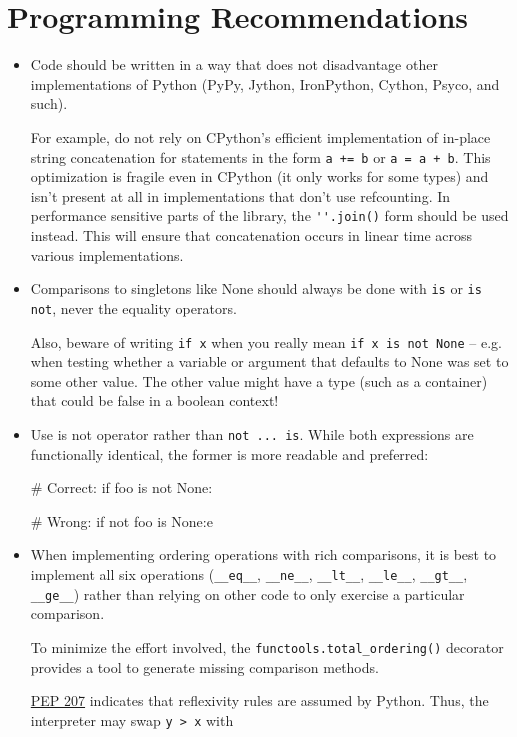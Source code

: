 \documentclass[a4paper,11pt]{article}
\begin{document}
\section{Programming Recommendations}
\begin{itemize}
\item Code should be written in a way that does not disadvantage other 
implementations of Python (PyPy, Jython, IronPython, Cython, Psyco, and such).
\par
For example, do not rely on CPython’s efficient implementation of in-place 
string concatenation for statements in the form \verb"a += b" or \verb"a = a + b".
This optimization is fragile even in CPython (it only works for some 
types) and isn’t present at all in implementations that don’t use 
refcounting. In performance sensitive parts of the library, the 
\verb!''.join()! form should be used instead. This will ensure that
concatenation occurs in linear time across various implementations.
\item Comparisons to singletons like None should always be done with 
\verb"is" or \verb"is not", never the equality operators.
\par
Also, beware of writing \verb"if x" when you really mean 
\verb"if x is not None" – e.g. when testing whether a variable or argument 
that defaults to None was set to some other value. The other value might have 
a type (such as a container) that could be false in a boolean context!
\item Use is not operator rather than \verb"not ... is". While both 
expressions are functionally identical, the former is more readable and 
preferred:
\begin{python}
# Correct:
if foo is not None:
\end{python}
\begin{python}
# Wrong:
if not foo is None:e
\end{python}
\item When implementing ordering operations with rich comparisons, it is best 
to implement all six operations (\verb"__eq__", \verb"__ne__", \verb"__lt__", 
\verb"__le__", \verb"__gt__", \verb"__ge__") rather than relying on other 
code to only exercise a particular comparison.
\par
To minimize the effort involved, the \verb"functools.total_ordering()" 
decorator provides a tool to generate missing comparison methods.
\par
\href{https://peps.python.org/pep-0207/}{PEP 207} indicates that reflexivity 
rules are assumed by Python. Thus, the interpreter may swap \verb"y > x" with 

\end{itemize}
\end{document}
